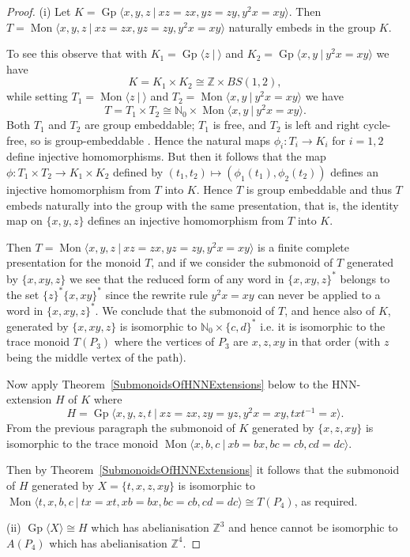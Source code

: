\documentclass{amsart}
\newcommand{\Mpres}[2]{\operatorname{Mon}\bigl\langle #1\:|\:#2 \bigr\rangle}
\newcommand{\Ggen}[1]{\operatorname{Gp}\bigl\langle #1 \bigr\rangle}
\newcommand{\Gpres}[2]{\operatorname{Gp}\bigl\langle #1\:|\:#2 \bigr\rangle}
\theoremstyle{plain}
\theoremstyle{definition}
\begin{document}
\begin{proof} 
(i)
Let $K = \Gpres{x,y,z}{xz=zx, yz=zy, y^2x = xy}$. Then $T = \Mpres{x,y,z}{xz=zx, yz=zy, y^2x = xy}$ naturally embeds in the group $K$.

To see this observe that with $K_1 = \Gpres{z}{} $ and $K_2 = \Gpres{x,y}{y^2x = xy} $ we have   
\[
K = K_1 \times K_2 \cong \mathbb{Z} \times BS(1,2), 
\]
while setting $T_1 = \Mpres{z}{}$ and $T_2 = \Mpres{x,y}{y^2x = xy}$ we have 
\[
T = T_1 \times T_2 \cong \mathbb{N}_0 \times  \Mpres{x,y}{y^2x = xy}. 
\] 
Both $T_1$ and $T_2$ are group embeddable; $T_1$ is free, and $T_2$ is left and right cycle-free, so is group-embeddable \cite[Theorem~5]{Adian1960}. Hence the natural maps $\phi_i: T_i \rightarrow K_i$ for $i=1,2$ define injective homomorphisms. But then it follows that the map $\phi \colon T_1 \times T_2 \rightarrow K_1 \times K_2 $ defined by $(t_1,t_2) \mapsto (\phi_1(t_1), \phi_2(t_2))$ defines an injective homomorphism from $T$ into $K$. Hence $T$ is group embeddable and thus $T$ embeds naturally into the group with the same presentation, that is, the identity map on $\{x,y,z\}$ defines an injective homomorphism from $T$ into $K$.     

Then $T = \Mpres{x,y,z}{xz=zx, yz=zy, y^2x = xy}$ is a finite complete presentation for the monoid $T$, and if we consider the submonoid of $T$ generated by $\{x, xy, z\}$ we see that the reduced form of any word in $\{x, xy, z\}^*$ belongs to the set $\{z\}^*\{x,xy\}^*$ since the rewrite rule $y^2x = xy$ can never be applied to a word in $\{x, xy, z\}^*$. We conclude that the submonoid of $T$, and hence also of $K$, generated by $\{x, xy, z\}$ is isomorphic to $\mathbb{N}_0 \times \{c,d\}^*$ i.e. it is isomorphic to the trace monoid $T(P_3)$ where the vertices of $P_3$ are $x, z, xy$ in that order (with $z$ being the middle vertex of the path).         

Now apply Theorem~\ref{SubmonoidsOfHNNExtensions} below to the HNN-extension $H$ of $K$ where   
\[
H =  \Gpres{x,y,z, t}{xz=zx, zy=yz, y^2x = xy, txt^{-1}=x}. 
\]
From the previous paragraph the submonoid of $K$ generated by $\{x, z, xy\}$ is isomorphic to the trace monoid $\Mpres{x,b,c}{xb=bx, bc=cb, cd=dc}$. 

Then by Theorem~\ref{SubmonoidsOfHNNExtensions} it follows that the submonoid of $H$ generated by $X = \{ t,x,z,xy\}$ is isomorphic to $\Mpres{t,x,b,c}{tx=xt, xb=bx, bc=cb, cd=dc} \cong T(P_4)$, as required.  

(ii) $\Ggen{X} \cong H$ which has abelianisation $\mathbb{Z}^3$ and hence cannot be isomorphic to $A(P_4)$ which has abelianisation $\mathbb{Z}^4$.     
\end{proof}
\end{document}
